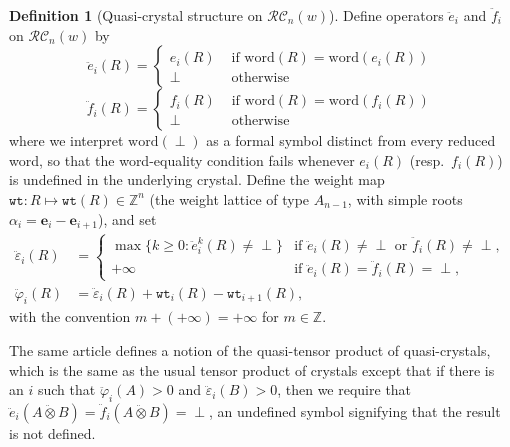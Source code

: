 \documentclass{amsart}
\theoremstyle{definition}
\newtheorem{definition}[lemma]{Definition}
\theoremstyle{remark}
\numberwithin{equation}{subsection}
\newcommand{\wtt}{\mathtt{wt}}
\newcommand{\RC}{\mathcal{RC}}
\begin{document}
\begin{definition}[Quasi-crystal structure on $\RC_n(w)$]\label{definition:quasicrystal}
Define operators $\ddot{e}_i$ and $\ddot{f}_i$ on $\RC_n(w)$ by
$$\ddot{e}_i(R) = \begin{cases}
  e_i(R) & \text{ if }\mathrm{word}(R) = \mathrm{word}(e_i(R))\\
  \perp & \text{ otherwise}
\end{cases}$$
$$\ddot{f}_i(R) = \begin{cases}
  f_i(R) & \text{ if }\mathrm{word}(R) = \mathrm{word}(f_i(R))\\
  \perp & \text{ otherwise}
\end{cases}$$
where we interpret $\mathrm{word}(\perp)$ as a formal symbol distinct from every reduced word, so that the word-equality condition fails whenever $e_i(R)$ (resp.\ $f_i(R)$) is undefined in the underlying crystal. Define the weight map $\wtt:R\mapsto\wtt(R)\in\mathbb{Z}^n$ (the weight lattice of type $A_{n-1}$, with simple roots $\alpha_i=\mathbf{e}_i-\mathbf{e}_{i+1}$), and set
\begin{align*}
\ddot{\varepsilon}_i(R) &= \begin{cases}\max\{k\geq 0:\ddot{e}_i^k(R)\neq\perp\}&\text{if }\ddot{e}_i(R)\neq\perp\text{ or }\ddot{f}_i(R)\neq\perp,\\ +\infty &\text{if }\ddot{e}_i(R)=\ddot{f}_i(R)=\perp,\end{cases}\\
\ddot{\varphi}_i(R) &= \ddot{\varepsilon}_i(R) + \wtt_i(R)-\wtt_{i+1}(R),
\end{align*}
with the convention $m+(+\infty)=+\infty$ for $m\in\mathbb{Z}$.

The same article \cite{cain2023quasicrystals} defines a notion of the quasi-tensor product of quasi-crystals, which is the same as the usual tensor product of crystals except that if there is an $i$ such that $\ddot{\varphi}_i(A)>0$ and $\ddot{\varepsilon}_i(B)>0$, then we require that $\ddot{e}_i(A\ddot{\otimes} B) =\ddot{f}_i(A\ddot{\otimes} B)= \perp$, an undefined symbol signifying that the result is not defined.
\end{definition}
\end{document}
